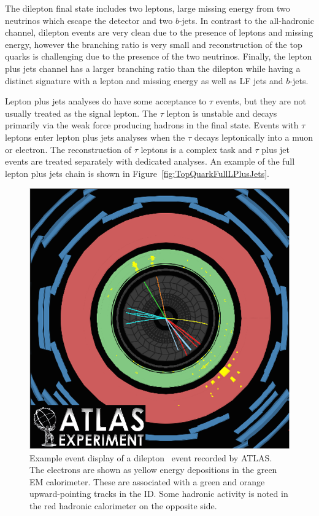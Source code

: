 The dilepton final state includes two leptons, large missing energy from two neutrinos which escape the detector and two $b$-jets. In contrast to the all-hadronic channel, dilepton events are very clean due to the presence of leptons and missing energy, however the branching ratio is very small and reconstruction of the top quarks is challenging due to the presence of the two neutrinos. Finally, the lepton plus jets channel has a larger branching ratio than the dilepton while having a distinct signature with a lepton and missing energy as well as LF jets and $b$-jets.

Lepton plus jets analyses do have some acceptance to $\tau$ events, but they are not usually treated as the signal lepton. The $\tau$ lepton is unstable and decays primarily via the weak force producing hadrons in the final state. Events with $\tau$ leptons enter lepton plus jets analyses when the $\tau$ decays leptonically into a muon or electron. The reconstruction of $\tau$ leptons is a complex task and $\tau$ plus jet events are treated separately with dedicated analyses. An example of the full lepton plus jets chain is shown in Figure~\ref{fig:TopQuarkFullLPlusJets}.

\begin{figure}[p]
  \centering
  \includegraphics[height=0.65\textheight]{PartTopQuark/Diagrams/atlas-2010-063-fig_09.png}
  \caption{Example event display of a dilepton \ttbar\ event recorded by ATLAS\@. The electrons are shown as yellow energy depositions in the green EM calorimeter. These are associated with a green and orange upward-pointing tracks in the ID\@. Some hadronic activity is noted in the red hadronic calorimeter on the opposite side.}\label{fig:TopQuarkEventDisplay}
\end{figure}

